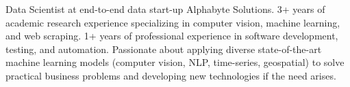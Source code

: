 

\begin{cvparagraph}

Data Scientist at end-to-end data start-up Alphabyte Solutions. 3+ years of academic research experience specializing in computer vision, machine learning, and web scraping. 1+ years of professional experience in software development, testing, and automation. Passionate about applying diverse state-of-the-art machine learning models (computer vision, NLP, time-series, geospatial) to solve practical business problems and developing new technologies if the need arises.
\end{cvparagraph}
